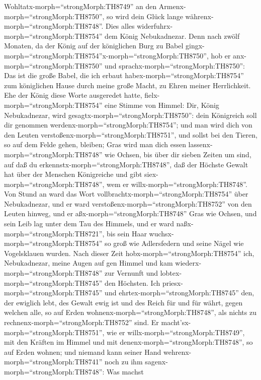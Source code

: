 Wohltatx-morph=``strongMorph:TH8749'' an den
Armenx-morph=``strongMorph:TH8750'', so wird dein Glück lange
währenx-morph=``strongMorph:TH8748''.  Dies alles
widerfuhrx-morph=``strongMorph:TH8754'' dem König Nebukadnezar.
 Denn nach zwölf Monaten, da der König auf der königlichen
Burg zu Babel
gingx-morph=``strongMorph:TH8754''x-morph=``strongMorph:TH8750'',
 hob er anx-morph=``strongMorph:TH8750'' und
sprachx-morph=``strongMorph:TH8750'': Das ist die große Babel, die ich
erbaut habex-morph=``strongMorph:TH8754'' zum königlichen Hause durch
meine große Macht, zu Ehren meiner Herrlichkeit.  Ehe der
König diese Worte ausgeredet hatte, fielx-morph=``strongMorph:TH8754''
eine Stimme von Himmel: Dir, König Nebukadnezar, wird
gesagtx-morph=``strongMorph:TH8750'': dein Königreich soll dir genommen
werdenx-morph=``strongMorph:TH8754'';  und man wird dich
von den Leuten verstoßenx-morph=``strongMorph:TH8751'', und sollst bei
den Tieren, so auf dem Felde gehen, bleiben; Gras wird man dich essen
lassenx-morph=``strongMorph:TH8748'' wie Ochsen, bis über dir sieben
Zeiten um sind, auf daß du erkennstx-morph=``strongMorph:TH8748'', daß
der Höchste Gewalt hat über der Menschen Königreiche und gibt
siex-morph=``strongMorph:TH8748'', wem er
willx-morph=``strongMorph:TH8748''.  Von Stund an ward das
Wort vollbrachtx-morph=``strongMorph:TH8754'' über Nebukadnezar, und er
ward verstoßenx-morph=``strongMorph:TH8752'' von den Leuten hinweg, und
er aßx-morph=``strongMorph:TH8748'' Gras wie Ochsen, und sein Leib lag
unter dem Tau des Himmels, und er ward
naßx-morph=``strongMorph:TH8721'', bis sein Haar
wuchsx-morph=``strongMorph:TH8754'' so groß wie Adlersfedern und seine
Nägel wie Vogelsklauen wurden.  Nach dieser Zeit
hobx-morph=``strongMorph:TH8754'' ich, Nebukadnezar, meine Augen auf gen
Himmel und kam wiederx-morph=``strongMorph:TH8748'' zur Vernunft und
lobtex-morph=``strongMorph:TH8745'' den Höchsten. Ich
priesx-morph=``strongMorph:TH8745'' und
ehrtex-morph=``strongMorph:TH8745'' den, der ewiglich lebt, des Gewalt
ewig ist und des Reich für und für währt,  gegen welchen
alle, so auf Erden wohnenx-morph=``strongMorph:TH8748'', als nichts zu
rechnenx-morph=``strongMorph:TH8752'' sind. Er
macht'sx-morph=``strongMorph:TH8751'', wie er
willx-morph=``strongMorph:TH8749'', mit den Kräften im Himmel und mit
denenx-morph=``strongMorph:TH8748'', so auf Erden wohnen; und niemand
kann seiner Hand wehrenx-morph=``strongMorph:TH8741'' noch zu ihm
sagenx-morph=``strongMorph:TH8748'': Was machst
